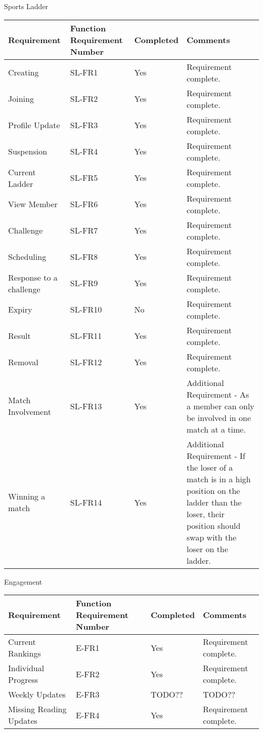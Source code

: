 Sports Ladder \\
\begin{center}
\begin{tabular}{ |l|l|l|l| }
\hline

Requirement & Function Requirement Number 		& Completed 	& Comments \\
\hline
Creating 											& SL-FR1	& Yes 		& Requirement complete. \\
Joining 											& SL-FR2	& Yes 		& Requirement complete. \\
Profile Update 										& SL-FR3	& Yes		& Requirement complete. \\
Suspension 											& SL-FR4	& Yes 		& Requirement complete. \\
Current Ladder	 									& SL-FR5	& Yes 		& Requirement complete. \\
View Member											& SL-FR6	& Yes 		& Requirement complete. \\
Challenge 											& SL-FR7	& Yes		& Requirement complete. \\
Scheduling 											& SL-FR8	& Yes 		& Requirement complete. \\
Response to a challenge 							& SL-FR9 	& Yes 		& Requirement complete. \\
Expiry 												& SL-FR10 	& No		& Requirement complete. \\
Result 												& SL-FR11 	& Yes 		& Requirement complete. \\
Removal 											& SL-FR12 	& Yes 		& Requirement complete. \\
Match Involvement									& SL-FR13 	& Yes 		& Additional Requirement - As a member can only be involved in one match at a time. \\
Winning a match 									& SL-FR14 	& Yes 		& Additional Requirement - If the loser of a match is in a high position on the ladder than the loser, their position should swap with the loser on the ladder. \\

\hline
\end{tabular}
\end{center}

Engagement \\
\begin{center}
\begin{tabular}{ |l|l|l|l| }
\hline

Requirement 	& Function Requirement Number 		& Completed 	& Comments \\
\hline
Current Rankings 									& E-FR1		& Yes	& Requirement complete. \\
Individual Progress									& E-FR2		& Yes	& Requirement complete. \\
Weekly Updates 										& E-FR3		& TODO??	& TODO?? \\
Missing Reading Updates 							& E-FR4		& Yes	& Requirement complete. \\

\hline
\end{tabular}
\end{center}


